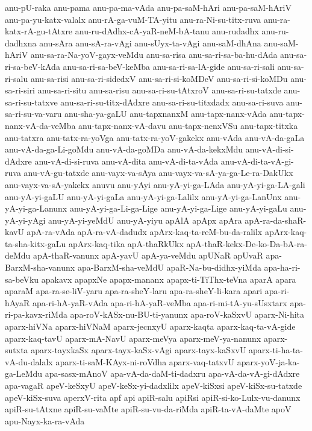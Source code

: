 {anu-pU-raka
anu-pama
anu-pa-ma-vAda
anu-pa-saM-hAri
anu-pa-saM-hAriV
anu-pa-yu-katx-valalx
anu-rA-ga-vuM-TA-yitu
anu-ra-Ni-su-titx-ruva
anu-ra-katx-rA-gu-tAtxre
anu-ru-dAdhx-cA-yaR-neM-bA-tanu
anu-rudadhx
anu-ru-dadhxna
anu-sAra
anu-sA-ra-vAgi
anu-sUyx-ta-vAgi
anu-saM-dhAna
anu-saM-hAriV
anu-sa-ra-Na-yoV-gayx-veMdu
anu-sa-risa
anu-sa-ri-sa-ba-hu-dAda
anu-sa-ri-sa-beV-kAda
anu-sa-ri-sa-beV-keMba
anu-sa-ri-sa-lA-gide
anu-sa-ri-sali
anu-sa-ri-salu
anu-sa-risi
anu-sa-ri-sidedxV
anu-sa-ri-si-koMDeV
anu-sa-ri-si-koMDu
anu-sa-ri-siri
anu-sa-ri-situ
anu-sa-risu
anu-sa-ri-su-tAtxroV
anu-sa-ri-su-tatxde
anu-sa-ri-su-tatxve
anu-sa-ri-su-titx-dAdxre
anu-sa-ri-su-titxdadx
anu-sa-ri-suva
anu-sa-ri-su-va-varu
anu-sha-ya-gaLU
anu-tapxnanxM
anu-tapx-nanx-vAda
anu-tapx-nanx-vA-da-veMba
anu-tapx-nanx-vA-davu
anu-tapx-nenxVSu
anu-tapx-titxka
anu-tatxra
anu-tatx-ra-yoVga
anu-tatx-ra-yoV-gakekx
anu-vAda
anu-vA-da-gaLa
anu-vA-da-ga-Li-goMdu
anu-vA-da-goMDa
anu-vA-da-kekxMdu
anu-vA-di-si-dAdxre
anu-vA-di-si-ruva
anu-vA-dita
anu-vA-di-ta-vAda
anu-vA-di-ta-vA-gi-ruva
anu-vA-gu-tatxde
anu-vayx-va-sAya
anu-vayx-va-sA-ya-ga-Le-ra-DakUkx
anu-vayx-va-sA-yakekx
anuvu
anu-yAyi
anu-yA-yi-ga-LAda
anu-yA-yi-ga-LA-gali
anu-yA-yi-gaLU
anu-yA-yi-gaLa
anu-yA-yi-ga-Lalilx
anu-yA-yi-ga-LanUnx
anu-yA-yi-ga-Lanunx
anu-yA-yi-ga-Li-ga-Lige
anu-yA-yi-ga-Lige
anu-yA-yi-gaLu
anu-yA-yi-yAgi
anu-yA-yi-yeMdU
anu-yA-yiyu
apAlA
apApx
apAra
apA-ra-da-shaR-kavU
apA-ra-vAda
apA-ra-vA-dadudx
apArx-kaq-ta-reM-bu-da-ralilx
apArx-kaq-ta-sha-kitx-gaLu
apArx-kaq-tika
apA-thaRkUkx
apA-thaR-kekx-De-ko-Da-bA-ra-deMdu
apA-thaR-vanunx
apA-yavU
apA-ya-veMdu
apUNaR
apUvaR
apa-BarxM-sha-vanunx
apa-BarxM-sha-veMdU
apaR-Na-bu-didhx-yiMda
apa-ha-ri-sa-beVku
apakavx
apapxNe
apapx-mananx
apapx-ti-TiThx-teVna
aparA
apara
aparaM
apa-ra-se-liV-yaru
apa-ra-sheY-laru
apa-ra-sheY-li-kara
apari
apa-ri-hAyaR
apa-ri-hA-yaR-vAda
apa-ri-hA-yaR-veMba
apa-ri-mi-tA-yu-sUsxtarx
apa-ri-pa-kavx-riMda
apa-roV-kASx-nu-BU-ti-yanunx
apa-roV-kaSxvU
aparx-Ni-hita
aparx-hiVNa
aparx-hiVNaM
aparx-jecnxyU
aparx-kaqta
aparx-kaq-ta-vA-gide
aparx-kaq-tavU
aparx-mA-NavU
aparx-meVya
aparx-meV-ya-nanunx
aparx-sutxta
aparx-tayxkaSx
aparx-tayx-kaSx-vAgi
aparx-tayx-kaSxvU
aparx-ti-ha-ta-vA-du-dalalx
aparx-ti-saM-KAyx-ni-roVdha
aparx-vaq-tatxvU
aparx-yoV-ja-ka-ga-LeMdu
apa-sasx-mAnoV
apa-vA-da-daM-ti-dadxru
apa-vA-da-vA-gi-dAdxre
apa-vagaR
apeV-keSxyU
apeV-keSx-yi-dadxlilx
apeV-kiSxsi
apeV-kiSx-su-tatxde
apeV-kiSx-suva
aperxV-rita
apf
api
apiR-salu
apiRsi
apiR-si-ko-Lulx-vu-danunx
apiR-su-tAtxne
apiR-su-vaMte
apiR-su-vu-da-riMda
apiR-ta-vA-daMte
apoV
apu-Nayx-ka-ra-vAda
}
